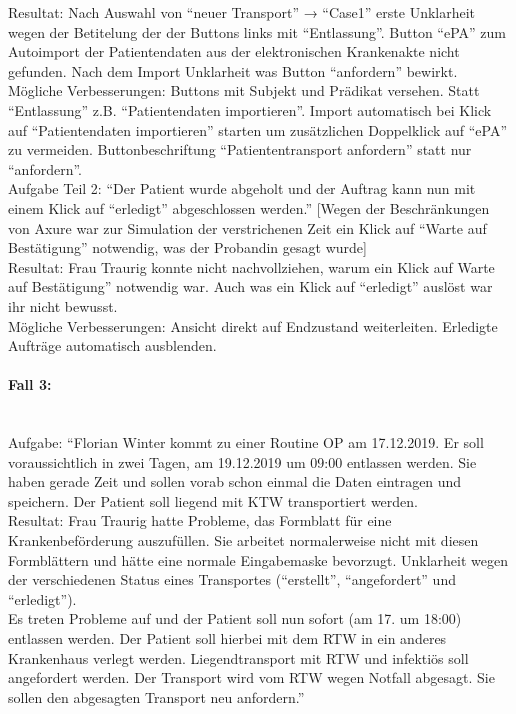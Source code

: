\documentclass[a4paper, ngerman, 12pt]{scrartcl}
\begin{document}
Resultat: Nach Auswahl von “neuer Transport” → “Case1” erste Unklarheit wegen der Betitelung der der Buttons links mit “Entlassung”. Button “ePA” zum Autoimport der Patientendaten aus der elektronischen Krankenakte nicht gefunden. Nach dem Import Unklarheit was Button “anfordern” bewirkt.\\

Mögliche Verbesserungen: Buttons mit Subjekt und Prädikat versehen. Statt “Entlassung” z.B. “Patientendaten importieren”. Import automatisch bei Klick auf “Patientendaten importieren” starten um zusätzlichen Doppelklick auf “ePA” zu vermeiden. Buttonbeschriftung “Patiententransport  anfordern” statt nur “anfordern”.\\
 
Aufgabe Teil 2: ``Der Patient wurde abgeholt und der Auftrag kann nun mit einem Klick auf ``erledigt'' abgeschlossen werden.''
[Wegen der Beschränkungen von Axure war zur Simulation der verstrichenen Zeit ein Klick auf “Warte auf Bestätigung” notwendig, was der Probandin gesagt wurde]\\
 
Resultat: Frau Traurig konnte nicht nachvollziehen, warum ein Klick auf Warte auf Bestätigung” notwendig war. Auch was ein Klick auf “erledigt” auslöst war ihr nicht bewusst.\\
 
Mögliche Verbesserungen: Ansicht direkt auf Endzustand weiterleiten. Erledigte Aufträge automatisch ausblenden.

\paragraph{Fall 3:}\leavevmode\\
Aufgabe: “Florian Winter kommt zu einer Routine OP am 17.12.2019. Er soll voraussichtlich in zwei Tagen, am 19.12.2019 um 09:00 entlassen werden. Sie haben gerade Zeit und sollen vorab schon einmal die Daten eintragen und speichern. Der Patient soll liegend mit KTW transportiert werden.\\
 
Resultat: Frau Traurig hatte Probleme, das Formblatt für eine Krankenbeförderung auszufüllen. Sie arbeitet normalerweise nicht mit diesen Formblättern und hätte eine normale Eingabemaske bevorzugt. Unklarheit wegen der verschiedenen Status eines Transportes (“erstellt”, “angefordert” und “erledigt”).\\
 
Es treten Probleme auf und der Patient soll nun sofort (am 17. um 18:00) entlassen werden. Der Patient soll hierbei mit dem RTW in ein anderes Krankenhaus verlegt werden. Liegendtransport mit RTW und infektiös soll angefordert werden. Der Transport wird vom RTW wegen Notfall abgesagt. Sie sollen den abgesagten Transport neu anfordern.”\\
 
\end{document}
